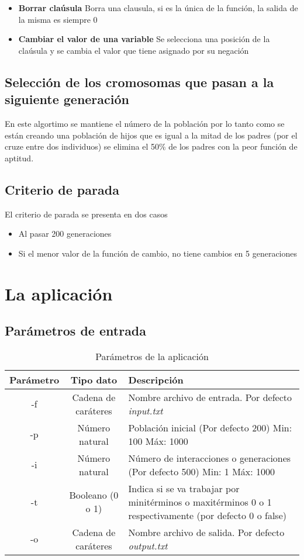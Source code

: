 \documentclass[a4paper]{article}
\begin{document}
\begin{itemize}
	\item \textbf{Borrar claúsula} Borra una clausula, si es la única de la función, la salida de la misma es siempre 0
	\item \textbf{Cambiar el valor de una variable} Se selecciona una posición de la claúsula y se cambia el valor que tiene asignado por su negación
\end{itemize}

\subsection{Selección de los cromosomas que pasan a la siguiente generación}

En este algortimo se mantiene el número de la población por lo tanto como se están creando una población de hijos que es igual a la mitad de los padres (por el cruze entre dos individuos) se elimina el 50\% de los padres con la peor función de aptitud.

\subsection{Criterio de parada}

El criterio de parada se presenta en dos casos

\begin{itemize}
	\item Al pasar 200 generaciones
	\item Si el menor valor de la función de cambio, no tiene cambios en 5 generaciones
\end{itemize}

\section{La aplicación}

\subsection{Parámetros de entrada}

\begin{table}[H]
	\centering
	\caption{Parámetros de la aplicación}
	\begin{tabular}{|c|c|p{5cm}|}
		\hline
		\textbf{Parámetro} & \textbf{Tipo dato} & \textbf{Descripción}\\
		\hline
		-f & Cadena de caráteres & Nombre archivo de entrada. Por defecto \textit{input.txt}\\
		\hline
		-p & Número natural & Población inicial (Por defecto 200) Min: 100 Máx: 1000\\
		\hline
		-i & Número natural & Número de interacciones o generaciones (Por defecto 500) Min: 1 Máx: 1000\\
		\hline
		-t & Booleano (0 o 1) & Indica si se va trabajar por minitérminos o maxitérminos 0 o 1 respectivamente (por defecto 0 o false)\\
		\hline
		-o & Cadena de caráteres & Nombre archivo de salida. Por defecto \textit{output.txt} \\
		\hline
	\end{tabular}
\end{table}
\end{document}

